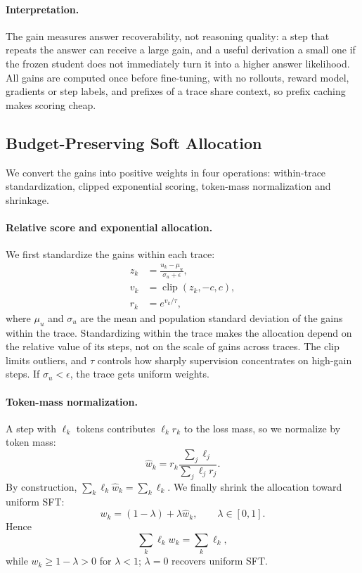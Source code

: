 \paragraph{Interpretation.}
The gain measures answer recoverability, not reasoning quality: a step that repeats the answer can receive a large gain, and a useful derivation a small one if the frozen student does not immediately turn it into a higher answer likelihood.
All gains are computed once before fine-tuning, with no rollouts, reward model, gradients or step labels, and prefixes of a trace share context, so prefix caching makes scoring cheap.

\subsection{Budget-Preserving Soft Allocation}
\label{sec:weights}
We convert the gains into positive weights in four operations: within-trace standardization, clipped exponential scoring, token-mass normalization and shrinkage.

\paragraph{Relative score and exponential allocation.}
We first standardize the gains within each trace:
\begin{equation}
\begin{aligned}
z_k &= \frac{u_k-\mu_u}{\sigma_u+\epsilon},
\\
v_k &= \operatorname{clip}(z_k,-c,c),
\\
r_k &= e^{v_k/\tau},
\end{aligned}
\label{eq:z}
\end{equation}
where $\mu_u$ and $\sigma_u$ are the mean and population standard deviation of the gains within the trace. Standardizing within the trace makes the allocation depend on the relative value of its steps, not on the scale of gains across traces. The clip limits outliers, and $\tau$ controls how sharply supervision concentrates on high-gain steps. If $\sigma_u<\epsilon$, the trace gets uniform weights.

\paragraph{Token-mass normalization.}
A step with $\ell_k$ tokens contributes $\ell_k r_k$ to the loss mass, so we normalize by token mass:
\begin{equation}
\hat w_k = r_k \frac{\sum_j\ell_j} {\sum_j\ell_jr_j}.
\label{eq:mass}
\end{equation}
By construction, $\sum_k\ell_k\hat w_k=\sum_k\ell_k$. We finally shrink the allocation toward uniform SFT:
\begin{equation}
w_k = (1-\lambda)+\lambda\hat w_k,
\qquad
\lambda\in[0,1].
\label{eq:weights}
\end{equation}
Hence
\begin{equation}
\sum_k\ell_kw_k = \sum_k\ell_k,
\label{eq:budget}
\end{equation}
while $w_k\ge 1-\lambda>0$ for $\lambda<1$; $\lambda=0$ recovers uniform SFT.

